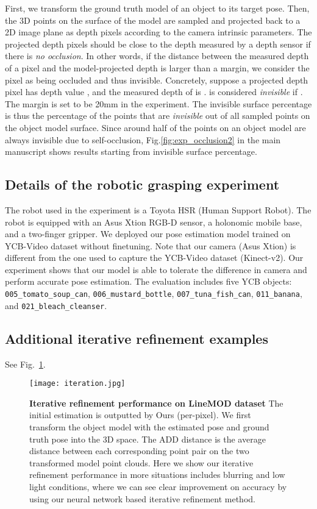 \documentclass[10pt,twocolumn,letterpaper]{article}
\begin{document}
First, we transform the ground truth model of an object to its target pose. Then, the 3D points on the surface of the model are sampled and projected back to a 2D image plane as depth pixels according to the camera intrinsic parameters. The projected depth pixels should be close to the depth measured by a depth sensor if there is \emph{no occlusion}. In other words, if the distance between the measured depth of a pixel and the model-projected depth is larger than a margin, we consider the pixel as being occluded and thus invisible. Concretely, suppose a projected depth pixel  has depth value , and the measured depth of  is .  is considered \emph{invisible} if . The margin  is set to be 20mm in the experiment.  The invisible surface percentage is thus the percentage of the points that are \emph{invisible} out of all sampled points on the object model surface. Since around half of the points on an object model are always invisible due to self-occlusion, Fig.\ref{fig:exp_occlusion2} in the main manuscript shows results starting from  invisible surface percentage.

\subsection{Details of the robotic grasping experiment}
The robot used in the experiment is a Toyota HSR (Human Support Robot). The robot is equipped with an Asus Xtion RGB-D sensor, a holonomic mobile base, and a two-finger gripper. We deployed our pose estimation model trained on YCB-Video dataset without finetuning. Note that our camera (Asus Xtion) is different from the one used to capture the YCB-Video dataset (Kinect-v2). Our experiment shows that our model is able to tolerate the difference in camera and perform accurate pose estimation. The evaluation includes five YCB objects: \texttt{005\_tomato\_soup\_can}, \texttt{006\_mustard\_bottle}, \texttt{007\_tuna\_fish\_can}, \texttt{011\_banana}, and \texttt{021\_bleach\_cleanser}. 


\subsection{Additional iterative refinement examples}
See Fig.~\ref{exp:supp_iterative}.

\begin{figure}[h]
	\centering
	\texttt{[image: iteration.jpg]}
	\caption{\textbf{Iterative refinement performance on LineMOD dataset} The initial estimation is outputted by Ours (per-pixel). We first transform the object model with the estimated pose and ground truth pose into the 3D space. The ADD distance is the average distance between each corresponding point pair on the two transformed model point clouds. Here we show our iterative refinement performance in more situations includes blurring and low light conditions, where we can see clear improvement on accuracy by using our neural network based iterative refinement method.}
	\label{exp:supp_iterative}
\end{figure}
\end{document}
